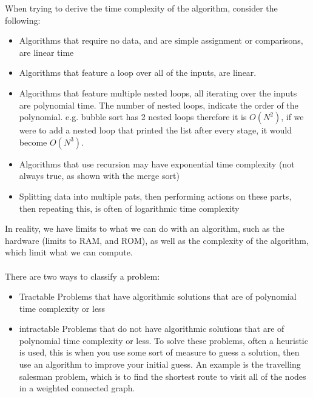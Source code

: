   When trying to derive the time complexity of the algorithm, consider the following:
  \begin{itemize}
  	\item Algorithms that require no data, and are simple assignment or comparisons, are linear time
  	\item Algorithms that feature a loop over all of the inputs, are linear.
  	\item Algorithms that feature multiple nested loops, all iterating over the inputs are polynomial time. The number of nested loops, indicate the order of the polynomial. e.g. bubble sort has 2 nested loops therefore it is $O(N^2)$, if we were to add a nested loop that printed the list after every stage, it would become $O(N^3)$.
  	\item Algorithms that use recursion may have exponential time complexity (not always true, as shown with the merge sort)
  	\item Splitting data into multiple pats, then performing actions on these parts, then repeating this, is often of logarithmic time complexity
  \end{itemize}
  
  \noindent
  In reality, we have limits to what we can do with an algorithm, such as the hardware (limits to RAM, and ROM), as well as the complexity of the algorithm, which limit what we can compute.\\ \\
  \noindent
  There are two ways to classify a problem:
  \begin{itemize}
  	\item Tractable
	  	\subitem Problems that have algorithmic solutions that are of polynomial time complexity or less
  	\item intractable
	  	\subitem Problems that do not have algorithmic solutions that are of polynomial time complexity or less. To solve these problems, often a heuristic is used, this is when you use some sort of measure to guess a solution, then use an algorithm to improve your initial guess. An example is the travelling salesman problem, which is to find the shortest route to visit all of the nodes in a weighted connected graph.
  \end{itemize}
  
